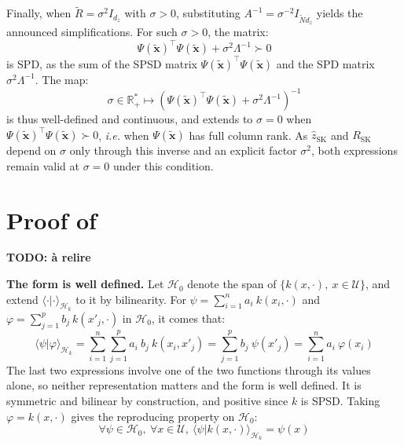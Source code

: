 Finally, when $\tilde{R}=\sigma^2I_{d_z}$ with $\sigma>0$, substituting $A^{-1}=\sigma^{-2}I_{\tilde{N}d_z}$ yields the announced simplifications. For such $\sigma>0$, the matrix:
\begin{equation}
	\Psi(\tilde{\mathbf{x}})^\top\Psi(\tilde{\mathbf{x}})+\sigma^2\Lambda^{-1}\succ0
\end{equation}
is SPD, as the sum of the SPSD matrix $\Psi(\tilde{\mathbf{x}})^\top\Psi(\tilde{\mathbf{x}})$ and the SPD matrix $\sigma^2\Lambda^{-1}$. The map:
\begin{equation}
	\sigma\in\mathbb{R}_+^*\mapsto\left(\Psi(\tilde{\mathbf{x}})^\top\Psi(\tilde{\mathbf{x}})+\sigma^2\Lambda^{-1}\right)^{-1}
\end{equation}
is thus well-defined and continuous, and extends to $\sigma=0$ when $\Psi(\tilde{\mathbf{x}})^\top\Psi(\tilde{\mathbf{x}})\succ0$, \textit{i.e.} when $\Psi(\tilde{\mathbf{x}})$ has full column rank. As $\hat{z}_{\mathrm{SK}}$ and $R_{\mathrm{SK}}$ depend on $\sigma$ only through this inverse and an explicit factor $\sigma^2$, both expressions remain valid at $\sigma=0$ under this condition.

\section[Proof of Proposition 3.15]{Proof of }\label{sec:proof_native_RKHS}

\textbf{TODO: à relire}

\textbf{The form is well defined.} Let $\mathcal{H}_0$ denote the span of $\{k(x,\cdot),\:x\in\mathcal{U}\}$, and extend $\langle\cdot|\cdot\rangle_{\mathcal{H}_k}$ to it by bilinearity. For $\psi=\sum_{i=1}^na_i\:k(x_i,\cdot)$ and $\varphi=\sum_{j=1}^pb_j\:k(x'_j,\cdot)$ in $\mathcal{H}_0$, it comes that:
\begin{equation}
	\langle\psi|\varphi\rangle_{\mathcal{H}_k}=\sum_{i=1}^n\sum_{j=1}^pa_i\:b_j\:k(x_i,x'_j)=\sum_{j=1}^pb_j\:\psi(x'_j)=\sum_{i=1}^na_i\:\varphi(x_i)\label{eq:RKHS_bilinear}
\end{equation}
The last two expressions involve one of the two functions through its values alone, so neither representation matters and the form is well defined. It is symmetric and bilinear by construction, and positive since $k$ is SPSD. Taking $\varphi=k(x,\cdot)$ gives the reproducing property on $\mathcal{H}_0$:
\begin{equation}
	\forall\psi\in\mathcal{H}_0,\:\forall x\in\mathcal{U},\:\langle\psi|k(x,\cdot)\rangle_{\mathcal{H}_k}=\psi(x)\label{eq:reproducing_generators}
\end{equation}

